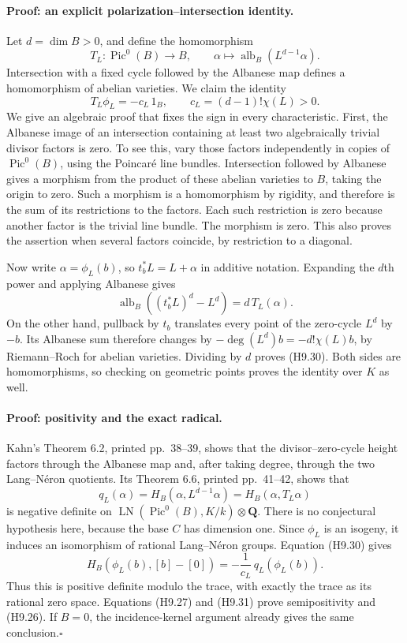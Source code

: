 \paragraph{Proof: an explicit polarization--intersection identity.}
Let $d=\dim B>0$, and define the homomorphism
\[
 T_L:\operatorname{Pic}^0(B)\longrightarrow B,
 \qquad \alpha\longmapsto
        \operatorname{alb}_B(L^{d-1}\alpha).
\]
Intersection with a fixed cycle followed by the Albanese map defines
a homomorphism of abelian varieties. We claim the identity
\[
 T_L\phi_L=-c_L\,1_B,
 \qquad c_L=(d-1)!\chi(L)>0.                                 \tag{H9.30}
\]
We give an algebraic proof that fixes the sign in every characteristic.
First, the Albanese image of an intersection containing at least two
algebraically trivial divisor factors is zero. To see this, vary those
factors independently in copies of $\operatorname{Pic}^0(B)$, using
the Poincar\'e line bundles. Intersection followed by Albanese gives a
morphism from the product of these abelian varieties to $B$, taking
the origin to zero. Such a morphism is a homomorphism by rigidity, and
therefore is the sum of its restrictions to the factors. Each such
restriction is zero because another factor is the trivial line bundle.
The morphism is zero. This also proves the assertion when several
factors coincide, by restriction to a diagonal.

Now write $\alpha=\phi_L(b)$, so $t_b^*L=L+\alpha$ in additive
notation. Expanding the $d$th power and applying Albanese gives
\[
 \operatorname{alb}_B((t_b^*L)^d-L^d)=d\,T_L(\alpha).
\]
On the other hand, pullback by $t_b$ translates every point of the
zero-cycle $L^d$ by $-b$. Its Albanese sum therefore changes by
$-\deg(L^d)b=-d!\chi(L)b$, by Riemann--Roch for abelian varieties.
Dividing by $d$ proves (H9.30). Both sides are homomorphisms, so
checking on geometric points proves the identity over $K$ as well.

\paragraph{Proof: positivity and the exact radical.}
Kahn's Theorem 6.2, printed pp.~38--39, shows that the divisor--zero-cycle
height factors through the Albanese map and, after taking degree, through
the two Lang--N\'eron quotients. Its Theorem 6.6, printed pp.~41--42,
shows that
\[
 q_L(\alpha)=H_B(\alpha,L^{d-1}\alpha)
             =H_B(\alpha,T_L\alpha)
\]
is negative definite on
$\operatorname{LN}(\operatorname{Pic}^0(B),K/k)\otimes\mathbf Q$.
There is no conjectural hypothesis here, because the base $C$ has
dimension one. Since $\phi_L$ is an isogeny, it induces an isomorphism
of rational Lang--N\'eron groups. Equation (H9.30) gives
\[
 H_B(\phi_L(b),[b]-[0])
       =-\frac{1}{c_L}\,q_L(\phi_L(b)).                     \tag{H9.31}
\]
Thus this is positive definite modulo the trace, with exactly the trace
as its rational zero space. Equations (H9.27) and (H9.31) prove
semipositivity and (H9.26). If $B=0$, the incidence-kernel argument
already gives the same conclusion.\hfill$\square$

